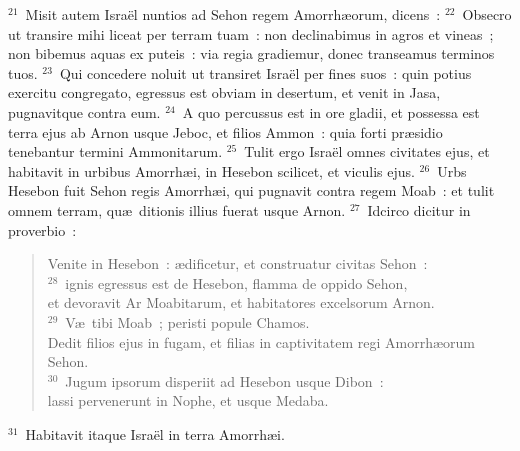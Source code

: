 ${}^{21}$~Misit autem Isra\"el nuntios ad Sehon regem Amorrh\ae orum, dicens~:
${}^{22}$~Obsecro ut transire mihi liceat per terram tuam~: non declinabimus in agros et vineas~; non bibemus aquas ex puteis~: via regia gradiemur, donec transeamus terminos tuos.
${}^{23}$~Qui concedere noluit ut transiret Isra\"el per fines suos~: quin potius exercitu congregato, egressus est obviam in desertum, et venit in Jasa, pugnavitque contra eum.
${}^{24}$~A quo percussus est in ore gladii, et possessa est terra ejus ab Arnon usque Jeboc, et filios Ammon~: quia forti pr\ae sidio tenebantur termini Ammonitarum.
${}^{25}$~Tulit ergo Isra\"el omnes civitates ejus, et habitavit in urbibus Amorrh\ae i, in Hesebon scilicet, et viculis ejus.
${}^{26}$~Urbs Hesebon fuit Sehon regis Amorrh\ae i, qui pugnavit contra regem Moab~: et tulit omnem terram, qu\ae\ ditionis illius fuerat usque Arnon.
${}^{27}$~Idcirco dicitur in proverbio~: \begin{flushleft}\begin{verse}Venite in Hesebon~: \ae dificetur, et construatur civitas Sehon~:\\
${}^{28}$~ignis egressus est de Hesebon, flamma de oppido Sehon,\\ et devoravit Ar Moabitarum, et habitatores excelsorum Arnon.\\
${}^{29}$~V\ae\ tibi Moab~; peristi popule Chamos.\\ Dedit filios ejus in fugam, et filias in captivitatem regi Amorrh\ae orum Sehon.\\
${}^{30}$~Jugum ipsorum disperiit ad Hesebon usque Dibon~:\\ lassi pervenerunt in Nophe, et usque Medaba.\end{verse}\end{flushleft}


${}^{31}$~Habitavit itaque Isra\"el in terra Amorrh\ae i.


